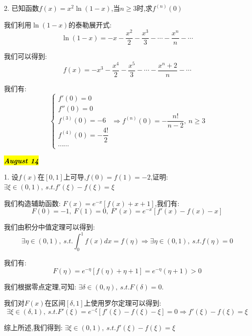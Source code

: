 2. 已知函数$f(x)=x^2\ln(1-x)$,当$n\geq 3$时,求$f^{(n)}(0)$
\begin{solution}

	我们利用$\ln(1-x)$的泰勒展开式:  
	$$\ln(1-x)=-x-\dfrac{x^2}{2}-\dfrac{x^3}{3}-\cdots-\dfrac{x^n}{n}-\cdots$$
	
	我们可以得到:  
	$$f(x)=-x^3-\dfrac{x^4}{2}-\dfrac{x^5}{3}-\cdots-\dfrac{x^n+2}{n}-\cdots$$
	
	我们有:  
	$$\left\lbrace
	\begin{array}{l}
		f'(0)=0\\
		f''(0)=0\\
		f^{(3)}(0)=-6\\
		f^{(4)}(0)=-\dfrac{4!}{2}\\
		\cdots\cdots
	\end{array}
	\right. \Rightarrow f^{(n)}(0)=-\dfrac{n!}{n-2},\ n\geq 3$$
\end{solution}

\hl{\textbf{\textit{August 14}}}

1. 设$f(x)$在$[0,1]$上可导,$f(0)=f(1)=-2$,证明:  $\exists \xi\in(0,1),\ s.t. f'(\xi)-f(\xi)=\xi$
\begin{solution}

	我们构造辅助函数:  $F(x)=e^{-x}\left[ f(x)+x+1\right]$,我们有:  
	$$F(0)=-1,\ F(1)=0,\ F'(x)=e^{-x}\left[ f'(x)-f(x)-x\right]$$
	
	我们由积分中值定理可以得到:  
	$$\exists \eta\in(0,1),\ s.t. \int_{0}^{1}f(x)dx=f(\eta)\Rightarrow \exists \eta\in(0,1),\ s.t. f(\eta)=0$$
	
	我们有:  
	$$F(\eta)=e^{-\eta}\left[ f(\eta)+\eta+1\right]=e^{-\eta}(\eta+1)>0$$
	
	我们根据零点定理,可知:  $\exists \delta\in(0,\eta),\ s.t. F(\delta)=0$.
	
	我们对$F(x)$在区间$[\delta,1]$上使用罗尔定理可以得到:  
	$$\exists\xi\in(\delta,1),\ s.t. F'(\xi)=e^{-\xi}\left[ f'(\xi)-f(\xi)-\xi\right]=0\Rightarrow f'(\xi)-f(\xi)=\xi$$
	
	综上所述,我们得到:  $\exists \xi\in(0,1),\ s.t. f'(\xi)-f(\xi)=\xi$
\end{solution}

